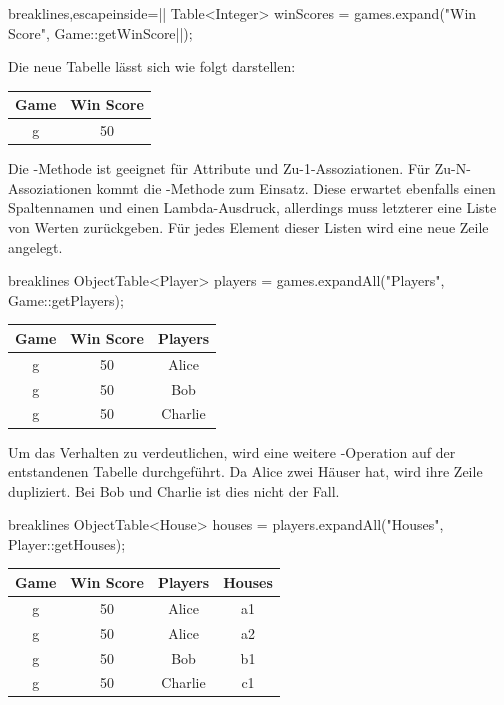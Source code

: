 \begin{jcodeblock*}{breaklines,escapeinside=||}
    Table<Integer> winScores = games.expand("Win Score", Game::getWinScore|\footnotemark|);
\end{jcodeblock*}

Die neue Tabelle lässt sich wie folgt darstellen:

\begin{tabular}{|c|c|}
    \hline
    \textbf{Game} & \textbf{Win Score} \\
    \hline
    g & 50 \\
    \hline
\end{tabular}

Die -Methode ist geeignet für Attribute und Zu-1-Assoziationen.
Für Zu-N-Assoziationen kommt die -Methode zum Einsatz.
Diese erwartet ebenfalls einen Spaltennamen und einen Lambda-Ausdruck, allerdings muss letzterer eine Liste von Werten zurückgeben.
Für jedes Element dieser Listen wird eine neue Zeile angelegt.

\begin{jcodeblock*}{breaklines}
    ObjectTable<Player> players = games.expandAll("Players", Game::getPlayers);
\end{jcodeblock*}

\begin{tabular}{|c|c|c|}
    \hline
    \textbf{Game} & \textbf{Win Score} & \textbf{Players} \\
    \hline
    g & 50 & Alice   \\
    g & 50 & Bob     \\
    g & 50 & Charlie \\
    \hline
\end{tabular}

Um das Verhalten zu verdeutlichen, wird eine weitere -Operation auf der entstandenen Tabelle durchgeführt.
Da Alice zwei Häuser hat, wird ihre Zeile dupliziert.
Bei Bob und Charlie ist dies nicht der Fall.

\begin{jcodeblock*}{breaklines}
    ObjectTable<House> houses = players.expandAll("Houses", Player::getHouses);
\end{jcodeblock*}

\begin{tabular}{|c|c|c|c|}
    \hline
    \textbf{Game} & \textbf{Win Score} & \textbf{Players} & \textbf{Houses} \\
    \hline
    g & 50 & Alice   & a1 \\
    g & 50 & Alice   & a2 \\
    g & 50 & Bob     & b1 \\
    g & 50 & Charlie & c1 \\
    \hline
\end{tabular}

